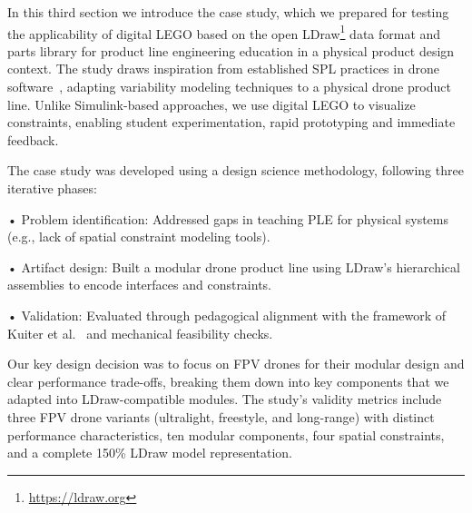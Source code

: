 \documentclass[sigconf,review]{acmart}
\begin{document}
In this third section we introduce the case study, which we prepared for testing the applicability of digital LEGO based on the open LDraw\footnote{\url{https://ldraw.org}} data format and parts library for product line engineering education in a physical product design context.
The study draws inspiration from established SPL practices in drone software~\cite{Steiner_2014}, adapting variability modeling techniques to a physical drone product line. 
Unlike Simulink-based approaches, we use digital LEGO to visualize constraints, enabling student experimentation, rapid prototyping and immediate feedback.

The case study was developed using a design science methodology, following three iterative phases:

•	Problem identification: Addressed gaps in teaching PLE for physical systems (e.g., lack of spatial constraint modeling tools).

•	Artifact design: Built a modular drone product line using LDraw’s hierarchical assemblies to encode interfaces and constraints.

•	Validation: Evaluated through pedagogical alignment with the framework of Kuiter et al.~\cite{Kuiter_2025} and mechanical feasibility checks.

Our key design decision was to focus on FPV drones for their modular design and clear performance trade-offs, breaking them down into key components that we adapted into LDraw-compatible modules. 
The study's validity metrics include three FPV drone variants (ultralight, freestyle, and long-range) with distinct performance characteristics, ten modular components, four spatial constraints, and a complete 150\% LDraw model representation.
\end{document}

